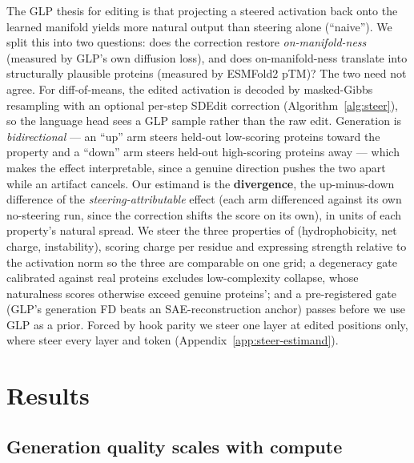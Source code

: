 \documentclass{article}
\begin{document}
The GLP thesis for editing is that projecting a steered activation back onto the learned
manifold yields more natural output than steering alone (``naive''). We split this into two
questions: does the correction restore \emph{on-manifold-ness} (measured by GLP's own diffusion
loss), and does on-manifold-ness translate into structurally plausible proteins (measured by
ESMFold2 pTM)? The two need not agree. For diff-of-means, the edited activation is decoded by
masked-Gibbs resampling with an optional per-step SDEdit correction \cite{meng2022sdedit}
(Algorithm~\ref{alg:steer}), so the language head sees a GLP sample rather than the raw edit.
Generation is \emph{bidirectional} --- an ``up'' arm steers held-out low-scoring proteins toward
the property and a ``down'' arm steers held-out high-scoring proteins away --- which makes the
effect interpretable, since a genuine direction pushes the two apart while an artifact cancels.
Our estimand is the \textbf{divergence}, the up-minus-down difference of the
\emph{steering-attributable} effect (each arm differenced against its own no-steering run, since
the correction shifts the score on its own), in units of each property's natural spread. We
steer the three properties of \cite{banerjee2025labelling} (hydrophobicity, net charge,
instability), scoring charge per residue and expressing strength relative to the activation norm
so the three are comparable on one grid; a degeneracy gate calibrated against real proteins
excludes low-complexity collapse, whose naturalness scores otherwise exceed genuine proteins';
and a pre-registered gate (GLP's generation FD beats an SAE-reconstruction anchor) passes before
we use GLP as a prior. Forced by hook parity we steer one layer at edited positions only, where
\cite{huang2025diffmean} steer every layer and token (Appendix~\ref{app:steer-estimand}).

\section{Results}

\subsection{Generation quality scales with compute}
\label{sec:gen-quality}
\end{document}
